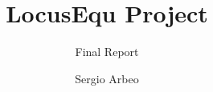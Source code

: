 \documentclass[12pt, oneside, a4paper]{article}
\begin{document}
\title{LocusEqu Project}\subtitle{Final Report}
\author{Sergio Arbeo}\date{}\maketitle
\end{document}
